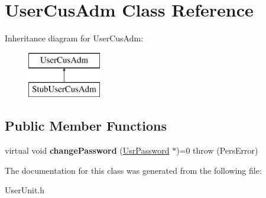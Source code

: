\hypertarget{classUserCusAdm}{\section{User\-Cus\-Adm Class Reference}
\label{d1/d48/classUserCusAdm}
}
Inheritance diagram for User\-Cus\-Adm\-:\begin{figure}[H]
\begin{center}
\leavevmode
\includegraphics[height=2.000000cm]{d1/d48/classUserCusAdm}
\end{center}
\end{figure}
\subsection*{Public Member Functions}
\begin{DoxyCompactItemize}
\item 
\hypertarget{classUserCusAdm_aa78ba1b0eb4f14ca68f8ef2318e9c3d1}{virtual void {\bfseries change\-Password} (\hyperlink{classUsrPassword}{Usr\-Password} $\ast$)=0  throw (\-Pers\-Error)}\label{d1/d48/classUserCusAdm_aa78ba1b0eb4f14ca68f8ef2318e9c3d1}

\end{DoxyCompactItemize}


The documentation for this class was generated from the following file\-:\begin{DoxyCompactItemize}
\item 
User\-Unit.\-h\end{DoxyCompactItemize}

